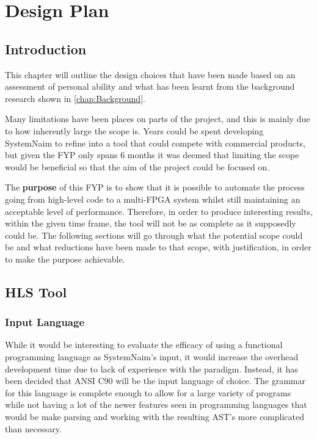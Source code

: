 \chapter{Design Plan}
\label{chap:Design}

\section{Introduction}
This chapter will outline the design choices that have been made based on an assessment of personal ability and what has been learnt from the background research shown in \autoref{chap:Background}.

Many limitations have been places on parts of the project, and this is mainly due to how inherently large the scope is. Years could be spent developing SystemNaim to refine into a tool that could compete with commercial products, but given the FYP only spans 6 months it was deemed that limiting the scope would be beneficial so that the aim of the project could be focused on.

The \textbf{purpose} of this FYP is to show that it is possible to automate the process going from high-level code to a multi-FPGA system whilst still maintaining an acceptable level of performance. Therefore, in order to produce interesting results, within the given time frame, the tool will not be as complete as it supposedly could be. The following sections will go through what the potential scope could be and what reductions have been made to that scope, with justification, in order to make the purpose achievable.

\section{HLS Tool}

\subsection{Input Language}

While it would be interesting to evaluate the efficacy of using a functional programming language as SystemNaim's input, it would increase the overhead development time due to lack of experience with the paradigm. Instead, it has been decided that ANSI C90 will be the input language of choice. The grammar for this language is complete enough to allow for a large variety of programs while not having a lot of the newer features seen in programming languages that would be make parsing and working with the resulting AST's more complicated than necessary. 

